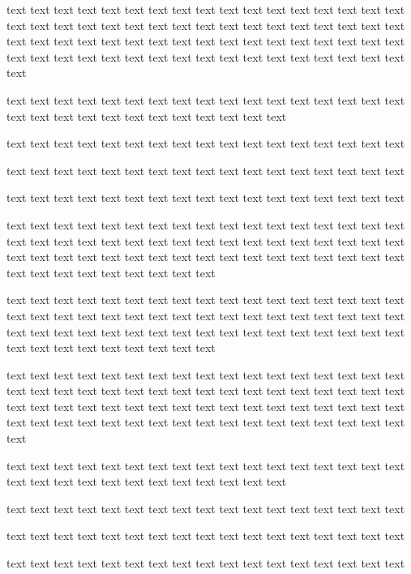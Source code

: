 \documentclass[twocolumn]{article}
\begin{document}
    text text text text text text text text text text text text text text text text text text text text text text text text text text text text text text text text text text text text text text text text text text text text text text text text text text text text text text text text text text text text text text text text text text text text text

    text text text text text text text text text text text text text text text text text text text text text text text text text text text text text

    text text text text text text text text text text text text text text text text text

    text text text text text text text text text text text text text text text text text

    text text text text text text text text text text text text text text text text text

text text text text text text text text text text text text text text text text text text text text text text text text text text text text text text text text text text text text text text text text text text text text text text text text text text text text text text text text text text text text

    text text text text text text text text text text text text text text text text text text text text text text text text text text text text text text text text text text text text text text text text text text text text text text text text text text text text text text text text text text text text

    text text text text text text text text text text text text text text text text text text text text text text text text text text text text text text text text text text text text text text text text text text text text text text text text text text text text text text text text text text text text text text text text text text text text text

    text text text text text text text text text text text text text text text text text text text text text text text text text text text text text

    text text text text text text text text text text text text text text text text text

    text text text text text text text text text text text text text text text text text

    text text text text text text text text text text text text text text text text text
\end{document}
